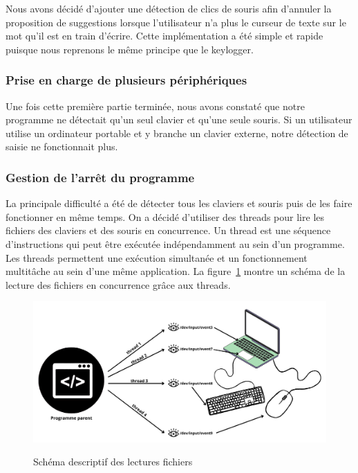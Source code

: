 \documentclass[a4paper, 11pt]{report}
\begin{document}
{Nous avons décidé d'ajouter une détection de clics de souris afin d'annuler la proposition de suggestions lorsque l'utilisateur n'a plus le curseur de texte sur le mot qu'il est en train d'écrire. Cette implémentation a été simple et rapide puisque nous reprenons le même principe que le keylogger. \\


\subsubsection{Prise en charge de plusieurs périphériques}

Une fois cette première partie terminée, nous avons constaté que notre programme ne détectait qu'un seul clavier et qu'une seule souris. Si un utilisateur utilise un ordinateur portable et y branche un clavier externe, notre détection de saisie ne fonctionnait plus. \\

\subsubsection{Gestion de l'arrêt du programme}

La principale difficulté a été de détecter tous les claviers et souris puis de les faire fonctionner en même temps. On a décidé d'utiliser des threads pour lire les fichiers des claviers et des souris en concurrence. Un thread est une séquence d'instructions qui peut être exécutée indépendamment au sein d'un programme. Les threads permettent une exécution simultanée et un fonctionnement multitâche au sein d'une même application. La figure~\ref{fig:lecture_fichier} montre un schéma de la lecture des fichiers en concurrence grâce aux threads.

\begin{figure}[H]
	\begin{center}
		{\includegraphics[width=\textwidth]{images/lecture-fichier.png}}
	\end{center}
	\caption{Schéma descriptif des lectures fichiers}
	\label{fig:lecture_fichier}
\end{figure}

}
\end{document}
